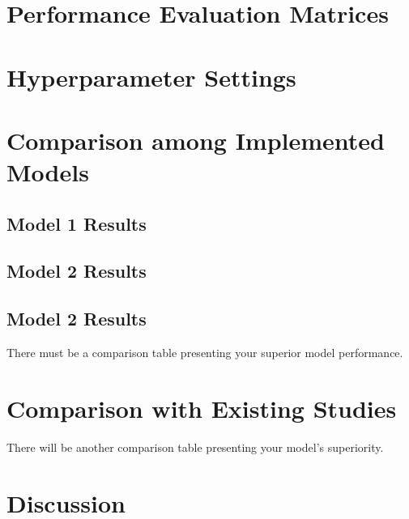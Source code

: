 \lipsum[9-10]

\section{Performance Evaluation Matrices}
\lipsum[1-1]

\section{Hyperparameter Settings}
\lipsum[4-6]

\section{Comparison among Implemented Models}
\lipsum[1-5]
\subsection{Model 1 Results}
\subsection{Model 2 Results}
\subsection{Model 2 Results}

There must be a comparison table presenting your superior model performance. 

\section{Comparison with Existing Studies}
There will be another comparison table presenting your model's superiority. 

\lipsum[1-8]

\section{Discussion}
\lipsum[2-3]